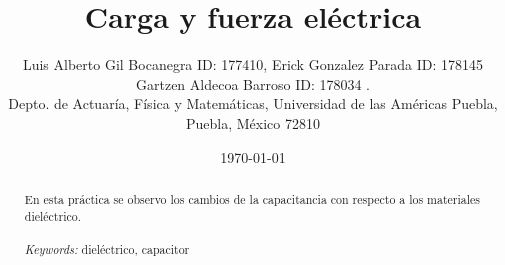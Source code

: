 \documentclass{article}
\begin{document}

\renewcommand{\footrulewidth}{1pt}
\renewcommand{\tablename}{Tabla}
\renewcommand{\figurename}{Figura}


\title{Carga y fuerza eléctrica}
\author{\small{Luis Alberto Gil Bocanegra ID: 177410, Erick Gonzalez Parada ID: 178145}\\
 \small{Gartzen Aldecoa Barroso ID: 178034 .}\\		%
	   \small{Depto. de Actuaría, Física y Matemáticas, Universidad de las Américas Puebla, Puebla, M\'exico 72810}}
\date{\small{\today}}

\maketitle


\begin{abstract}
	En esta práctica se observo los cambios de la capacitancia con respecto a los materiales 
	dieléctrico.
\\
\\
{\it Keywords:}  dieléctrico, capacitor 
\\
\\
\end{abstract}

\end{document}
